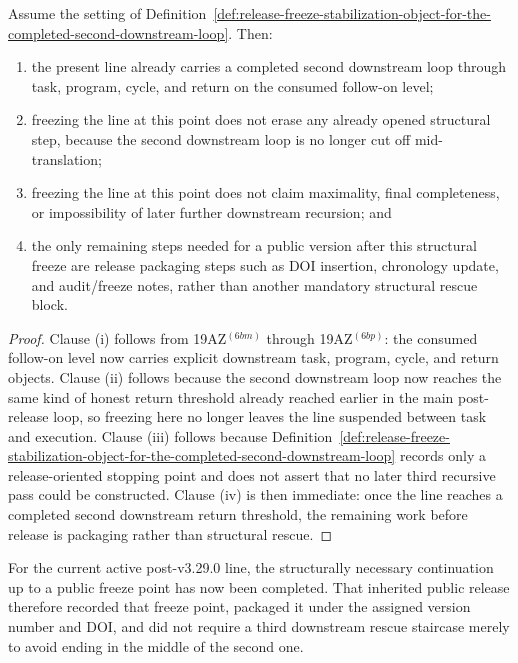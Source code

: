 \begin{proposition}
\label{prop:the-completed-second-downstream-loop-already-supplies-an-honest-public-freeze-point}
Assume the setting of Definition~\ref{def:release-freeze-stabilization-object-for-the-completed-second-downstream-loop}. Then:
\begin{enumerate}[label=(\roman*)]
  \item the present line already carries a completed second downstream loop through task, program, cycle, and return on the consumed follow-on level;
  \item freezing the line at this point does not erase any already opened structural step, because the second downstream loop is no longer cut off mid-translation;
  \item freezing the line at this point does not claim maximality, final completeness, or impossibility of later further downstream recursion; and
  \item the only remaining steps needed for a public version after this structural freeze are release packaging steps such as DOI insertion, chronology update, and audit/freeze notes, rather than another mandatory structural rescue block.
\end{enumerate}
\end{proposition}

\begin{proof}
Clause (i) follows from 19AZ$^{(6bm)}$ through 19AZ$^{(6bp)}$: the consumed follow-on level now carries explicit downstream task, program, cycle, and return objects. Clause (ii) follows because the second downstream loop now reaches the same kind of honest return threshold already reached earlier in the main post-release loop, so freezing here no longer leaves the line suspended between task and execution. Clause (iii) follows because Definition~\ref{def:release-freeze-stabilization-object-for-the-completed-second-downstream-loop} records only a release-oriented stopping point and does not assert that no later third recursive pass could be constructed. Clause (iv) is then immediate: once the line reaches a completed second downstream return threshold, the remaining work before release is packaging rather than structural rescue.
\end{proof}

\begin{corollary}
\label{cor:the-next-public-version-now-needs-doi-and-audit-rather-than-another-mandatory-rescue-staircase}
For the current active post-v3.29.0 line, the structurally necessary continuation up to a public freeze point has now been completed. That inherited public release therefore recorded that freeze point, packaged it under the assigned version number and DOI, and did not require a third downstream rescue staircase merely to avoid ending in the middle of the second one.
\end{corollary}

